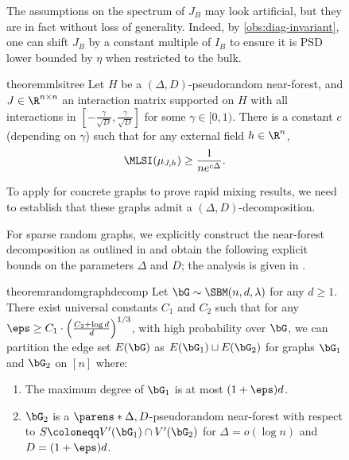 \documentclass[11pt,letterpaper]{article}
\begin{document}
\begin{figure}
    \begin{remark}
        The assumptions on the spectrum of $J_B$ may look artificial, but they are in fact without loss of generality. Indeed, by \cref{obs:diag-invariant}, one can shift $J_B$ by a constant multiple of $I_B$ to ensure it is PSD lower bounded by $\eta$ when restricted to the bulk. 
    \end{remark}
    \begin{restatable}{theorem}{mlsitree}
        \label{thm:mlsi-bdd-growth-tree}
        Let $H$ be a $(\Delta,D)$-pseudorandom near-forest, and $J \in \R^{n \times n}$ an interaction matrix supported on $H$ with all interactions in $\left[ - \frac{\gamma}{\sqrt{D}} , \frac{\gamma}{\sqrt{D}} \right]$ for some $\gamma \in [0,1)$. There is a constant $c$ (depending on $\gamma$) such that for any external field $h \in \R^{n}$,
        \[ \MLSI(\mu_{J,h}) \ge \frac{1}{ne^{c\Delta}} . \]
    \end{restatable}

    To apply  for concrete graphs to prove rapid mixing results, we need to establish that these graphs admit a $(\Delta, D)$-decomposition. 


    For sparse random graphs, we explicitly construct the near-forest decomposition as outlined in  and obtain the following explicit bounds on the parameters $\Delta$ and $D$; the analysis is given in .
    \begin{restatable}{theorem}{randomgraphdecomp}   \label{lem:random-graph-decomposition}
        Let $\bG\sim\SBM(n, d, \lambda)$ for any $d\ge 1$.
        There exist universal constants $C_1$ and $C_2$ such that for any $\eps \ge C_1 \cdot \left( \frac{C_2 + \log d}{d} \right)^{1/3}$, with high probability over $\bG$, we can partition the edge set $E(\bG)$ as $E(\bG_1) \sqcup E(\bG_2)$ for graphs $\bG_1$ and $\bG_2$ on $[n]$ where:
        \begin{enumerate}
            \item \label{item:max-degree-bound} The maximum degree of $\bG_1$ is at most $(1+\eps)d$.
            \item \label{item:near-forest-property} $\bG_2$ is a $\parens*{\Delta, D}$-pseudorandom near-forest with respect to $S\coloneqq V'(\bG_1)\cap V'(\bG_2)$ for $\Delta = o(\log n)$ and $D = (1+\eps)d$.
        \end{enumerate}
    \end{restatable}
    

\end{figure}
\end{document}
